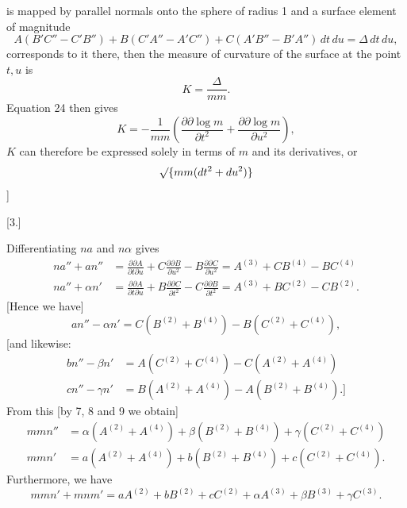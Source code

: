 %
\noindent is mapped by parallel normals onto the sphere of radius 1 and a surface element of magnitude
\[
A(B'C''-C'B'')+B(C'A''-A'C'')+C(A'B''-B'A'')\,dt\,du=\Delta\,dt\,du,
\]
corresponds to it there, then the measure of curvature of the surface at the point $t,u$ is
\[
K=\frac{\Delta}{mm}.
\]
Equation 24 then gives
\begin{equation}\tag*{[25]}
K=-\frac1{mm}\left(\frac{\partial\partial\log m}{\partial t^2}+\frac{\partial\partial\log m}{\partial u^2}\right),
\end{equation}
$K$ can therefore be expressed solely in terms of $m$ and its derivatives, or 
\[
\mathord{\surd}\{mm(dt^2+du^2)\}
\]
]
\begin{center}[3.]\end{center}
\noindent\hspace*{1.2em} Differentiating $na$ and $n\alpha$ gives
\[
\begin{aligned}
na''+an''&=\frac{\partial\partial A}{\partial t\partial u}+C\frac{\partial\partial B}{\partial u^2}-B\frac{\partial\partial C}{\partial u^2}=A^{(3)}+CB^{(4)}-BC^{(4)}\\
na''+\alpha n'&=\frac{\partial\partial A}{\partial t\partial u}+B\frac{\partial\partial C}{\partial t^2}-C\frac{\partial\partial B}{\partial t^2}=A^{(3)}+BC^{(2)}-CB^{(2)}.
\end{aligned}
\]
[Hence we have]
\[
an''-\alpha n'=C(B^{(2)}+B^{(4)})-B(C^{(2)}+C^{(4)}),
\]
[and likewise:
\[
\begin{aligned}
bn''-\beta n'&=A(C^{(2)}+C^{(4)})-C(A^{(2)}+A^{(4)})\\
cn''-\gamma n'&=B(A^{(2)}+A^{(4)})-A(B^{(2)}+B^{(4)}).]
\end{aligned}
\]
From this [by 7, 8 and 9 we obtain]
\[
\begin{aligned}
mmn''&=\alpha(A^{(2)}+A^{(4)})+\beta(B^{(2)}+B^{(4)})+\gamma(C^{(2)}+C^{(4)})\\
mmn'&=a(A^{(2)}+A^{(4)})+b(B^{(2)}+B^{(4)})+c(C^{(2)}+C^{(4)}).
\end{aligned}
\]
Furthermore, we have
\[
mmn'+mnm'=aA^{(2)}+bB^{(2)}+cC^{(2)}+\alpha A^{(3)}+\beta B^{(3)}+\gamma C^{(3)}.
\]
